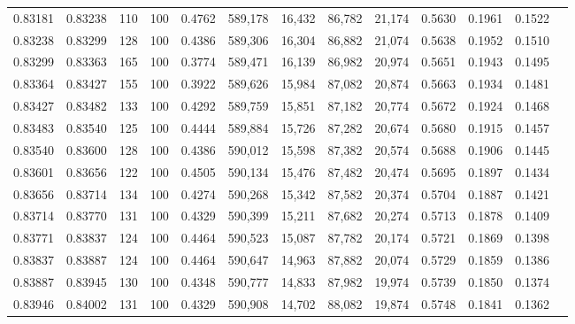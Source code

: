 \begin{tabular}{rrrrrrrrrrrrr}
0.83181 & 0.83238 &   110 & 100 &                                     0.4762 & 589,178 &  16,432 &  86,782 &  21,174 & 0.5630 & 0.1961 & 0.1522 \\
0.83238 & 0.83299 &   128 & 100 &                                     0.4386 & 589,306 &  16,304 &  86,882 &  21,074 & 0.5638 & 0.1952 & 0.1510 \\
0.83299 & 0.83363 &   165 & 100 &                                     0.3774 & 589,471 &  16,139 &  86,982 &  20,974 & 0.5651 & 0.1943 & 0.1495 \\
0.83364 & 0.83427 &   155 & 100 &                                     0.3922 & 589,626 &  15,984 &  87,082 &  20,874 & 0.5663 & 0.1934 & 0.1481 \\
0.83427 & 0.83482 &   133 & 100 &                                     0.4292 & 589,759 &  15,851 &  87,182 &  20,774 & 0.5672 & 0.1924 & 0.1468 \\
0.83483 & 0.83540 &   125 & 100 &                                     0.4444 & 589,884 &  15,726 &  87,282 &  20,674 & 0.5680 & 0.1915 & 0.1457 \\
0.83540 & 0.83600 &   128 & 100 &                                     0.4386 & 590,012 &  15,598 &  87,382 &  20,574 & 0.5688 & 0.1906 & 0.1445 \\
0.83601 & 0.83656 &   122 & 100 &                                     0.4505 & 590,134 &  15,476 &  87,482 &  20,474 & 0.5695 & 0.1897 & 0.1434 \\
0.83656 & 0.83714 &   134 & 100 &                                     0.4274 & 590,268 &  15,342 &  87,582 &  20,374 & 0.5704 & 0.1887 & 0.1421 \\
0.83714 & 0.83770 &   131 & 100 &                                     0.4329 & 590,399 &  15,211 &  87,682 &  20,274 & 0.5713 & 0.1878 & 0.1409 \\
0.83771 & 0.83837 &   124 & 100 &                                     0.4464 & 590,523 &  15,087 &  87,782 &  20,174 & 0.5721 & 0.1869 & 0.1398 \\
0.83837 & 0.83887 &   124 & 100 &                                     0.4464 & 590,647 &  14,963 &  87,882 &  20,074 & 0.5729 & 0.1859 & 0.1386 \\
0.83887 & 0.83945 &   130 & 100 &                                     0.4348 & 590,777 &  14,833 &  87,982 &  19,974 & 0.5739 & 0.1850 & 0.1374 \\
0.83946 & 0.84002 &   131 & 100 &                                     0.4329 & 590,908 &  14,702 &  88,082 &  19,874 & 0.5748 & 0.1841 & 0.1362 \\

\end{tabular}
